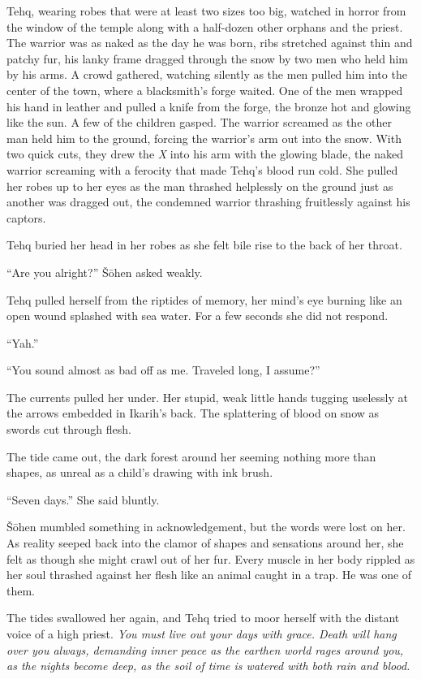 Tehq, wearing robes that were at least two sizes too big, watched in horror from the window of the temple along with a half-dozen other orphans and the priest. The warrior was as naked as the day he was born, ribs stretched against thin and patchy fur, his lanky frame dragged through the snow by two men who held him by his arms. A crowd gathered, watching silently as the men pulled him into the center of the town, where a blacksmith's forge waited. One of the men wrapped his hand in leather and pulled a knife from the forge, the bronze hot and glowing like the sun. A few of the children gasped. The warrior screamed as the other man held him to the ground, forcing the warrior's arm out into the snow. With two quick cuts, they drew the \emph{X} into his arm with the glowing blade, the naked warrior screaming with a ferocity that made Tehq's blood run cold. She pulled her robes up to her eyes as the man thrashed helplessly on the ground just as another was dragged out, the condemned warrior thrashing fruitlessly against his captors.

Tehq buried her head in her robes as she felt bile rise to the back of her throat.

``Are you alright?'' Šōhen asked weakly.

Tehq pulled herself from the riptides of memory, her mind's eye burning like an open wound splashed with sea water. For a few seconds she did not respond.

``Yah.''

``You sound almost as bad off as me. Traveled long, I assume?''

The currents pulled her under. Her stupid, weak little hands tugging uselessly at the arrows embedded in Ikarih's back. The splattering of blood on snow as swords cut through flesh.

The tide came out, the dark forest around her seeming nothing more than shapes, as unreal as a child's drawing with ink brush.

``Seven days.'' She said bluntly.

Šōhen mumbled something in acknowledgement, but the words were lost on her. As reality seeped back into the clamor of shapes and sensations around her, she felt as though she might crawl out of her fur. Every muscle in her body rippled as her soul thrashed against her flesh like an animal caught in a trap. He was one of them.

The tides swallowed her again, and Tehq tried to moor herself with the distant voice of a high priest. \emph{You must live out your days with grace. Death will hang over you always, demanding inner peace as the earthen world rages around you, as the nights become deep, as the soil of time is watered with both rain and blood.}

